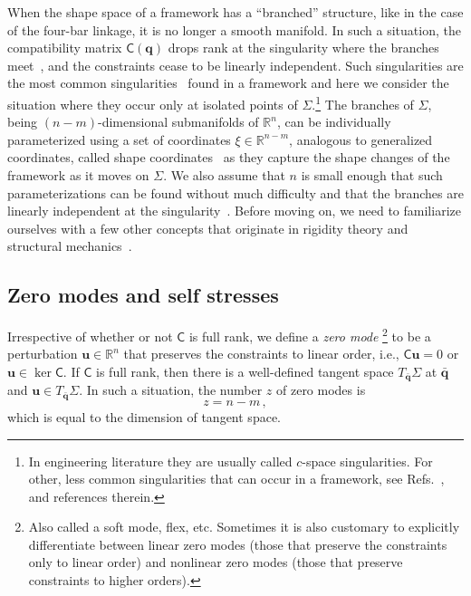 When the shape space of a framework has a ``branched'' structure, like in the case of the four-bar linkage, it is no longer a smooth manifold.
In such a situation, the compatibility matrix $\mathsf{C}(\bm{q})$ drops rank at the singularity where the branches meet~\cite{lopez-custodio2020,muller2019}, and the constraints cease to be linearly independent.
Such singularities are the most common singularities~\cite{lopez-custodio2019,lopez-custodio2020} found in a framework and here we consider the situation where they occur only at isolated points of $\Sigma$.\footnote{In engineering literature they are usually called $c$-space singularities. For other, less common singularities that can occur in a framework, see Refs.~\cite{lopez-custodio2020,muller2019,muller2017}, and references therein.}
The branches of $\Sigma$, being $(n-m)$-dimensional submanifolds of $\mathbb{R}^{n}$, can be individually parameterized using a set of coordinates $\xi \in \mathbb{R}^{n-m}$, analogous to generalized coordinates, called shape coordinates~\cite{littlejohn1995} as they capture the shape changes of the framework as it moves on $\Sigma$.
We also assume that $n$ is small enough that such parameterizations can be found without much difficulty and that
the branches are linearly independent at the singularity~\cite{lopez-custodio2020}.
Before moving on, we need to familiarize ourselves with a few other concepts that originate in rigidity theory and structural mechanics~\cite{williams2003,connelly2022}.

\subsection{Zero modes and self stresses}

Irrespective of whether or not $\mathsf{C}$ is full rank, we define a \emph{zero mode}%
\footnote{Also called a soft mode, flex, etc.
Sometimes it is also customary to explicitly differentiate between linear zero modes (those that preserve the constraints only to linear order) and nonlinear zero modes (those that preserve constraints to higher orders).}
to be a perturbation $\bm{u} \in \mathbb{R}^n$ that preserves the constraints to linear order, i.e., $\mathsf{C}\bm{u} = 0$ or $\bm{u} \in \ker \mathsf{C}$.
If $\mathsf{C}$ is full rank, then there is a well-defined tangent space $T_{\bar{\bm{q}}}\Sigma$ at $\bar{\bm{q}}$ and $\bm{u} \in T_{\bar{\bm{q}}} \Sigma$.
In such a situation, the number $z$ of zero modes is
%
\begin{equation}
  z = n - m\,,
\end{equation}
%
which is equal to the dimension of tangent space.

